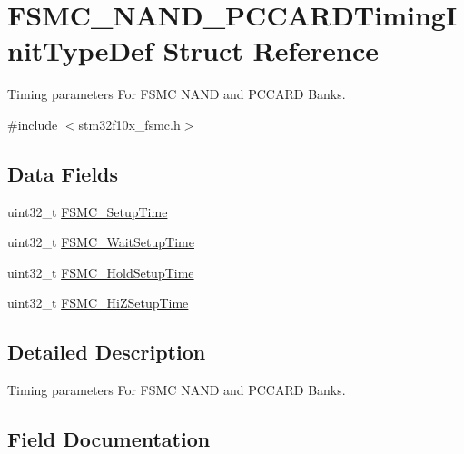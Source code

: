 \hypertarget{struct_f_s_m_c___n_a_n_d___p_c_c_a_r_d_timing_init_type_def}{}\section{F\+S\+M\+C\+\_\+\+N\+A\+N\+D\+\_\+\+P\+C\+C\+A\+R\+D\+Timing\+Init\+Type\+Def Struct Reference}
\label{struct_f_s_m_c___n_a_n_d___p_c_c_a_r_d_timing_init_type_def}


Timing parameters For F\+S\+MC N\+A\+ND and P\+C\+C\+A\+RD Banks.  




{\ttfamily \#include $<$stm32f10x\+\_\+fsmc.\+h$>$}

\subsection*{Data Fields}
\begin{DoxyCompactItemize}
\item 
uint32\+\_\+t \mbox{\hyperlink{struct_f_s_m_c___n_a_n_d___p_c_c_a_r_d_timing_init_type_def_a3b0b076d6c5cae5a023aba6d74ffb1b7}{F\+S\+M\+C\+\_\+\+Setup\+Time}}
\item 
uint32\+\_\+t \mbox{\hyperlink{struct_f_s_m_c___n_a_n_d___p_c_c_a_r_d_timing_init_type_def_abf4f8b523317ce9a2e079c2b5ac1d857}{F\+S\+M\+C\+\_\+\+Wait\+Setup\+Time}}
\item 
uint32\+\_\+t \mbox{\hyperlink{struct_f_s_m_c___n_a_n_d___p_c_c_a_r_d_timing_init_type_def_a9830626a2ab6b45fa384adbc5c55eb69}{F\+S\+M\+C\+\_\+\+Hold\+Setup\+Time}}
\item 
uint32\+\_\+t \mbox{\hyperlink{struct_f_s_m_c___n_a_n_d___p_c_c_a_r_d_timing_init_type_def_ae39ab3cbe94c85c5614018cd0fc40094}{F\+S\+M\+C\+\_\+\+Hi\+Z\+Setup\+Time}}
\end{DoxyCompactItemize}


\subsection{Detailed Description}
Timing parameters For F\+S\+MC N\+A\+ND and P\+C\+C\+A\+RD Banks. 

\subsection{Field Documentation}
\mbox{\label{struct_f_s_m_c___n_a_n_d___p_c_c_a_r_d_timing_init_type_def_ae39ab3cbe94c85c5614018cd0fc40094}} 
